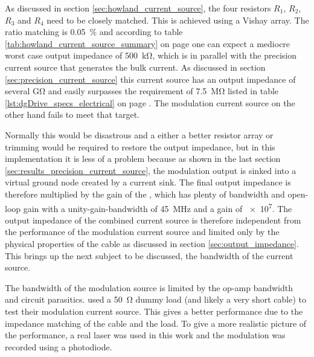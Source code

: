 As discussed in section \ref{sec:howland_current_source}, the four resistors $R_1$, $R_2$, $R_3$ and $R_4$ need to be closely matched. This is achieved using a Vishay  \cite{datasheet_MORN} array. The ratio matching is \qty{0.05}{\percent} and according to table \ref{tab:howland_current_source_summary} on page \pageref{tab:howland_current_source_summary} one can expect a mediocre worst case output impedance of \qty{500}{\kilo\ohm}, which is in parallel with the precision current source that generates the bulk current. As discussed in section \ref{sec:precision_current_source} this current source has an output impedance of several \unit{\giga\ohm} and easily surpasses the requirement of \qty{7.5}{\mega\ohm} listed in table \ref{lst:dgDrive_specs_electrical} on page \pageref{lst:dgDrive_specs_electrical}. The modulation current source on the other hand fails to meet that target.

Normally this would be disastrous and a either a better resistor array or trimming would be required to restore the output impedance, but in this implementation it is less of a problem because as shown in the last section \ref{sec:results_precision_current_source}, the modulation output is sinked into a virtual ground node created by a current sink. The final output impedance is therefore multiplied by the gain of the , which has plenty of bandwidth and open-loop gain with a unity-gain-bandwidth of \qty{45}{\MHz} and a gain of \num{e7}. The output impedance of the combined current source is therefore independent from the performance of the modulation current source and limited only by the physical properties of the cable as discussed in section \ref{sec:output_impedance}. This brings up the next subject to be discussed, the bandwidth of the current source.

The bandwidth of the modulation source is limited by the op-amp bandwidth and circuit parasitics. \citeauthor{laser_driver_digital} \cite{laser_driver_digital} used a \qty{50}{\ohm} dummy load (and likely a very short cable) to test their modulation current source. This gives a better performance due to the impedance matching of the cable and the load. To give a more realistic picture of the performance, a real laser was used in this work and the modulation was recorded using a photodiode.

